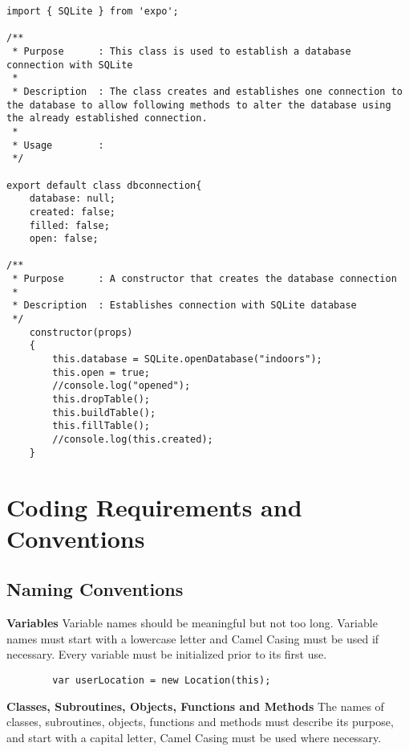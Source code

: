 \documentclass{article}
\begin{document}
\begin{lstlisting}
import { SQLite } from 'expo';

/**
 * Purpose		: This class is used to establish a database connection with SQLite
 * 
 * Description	: The class creates and establishes one connection to the database to allow following methods to alter the database using the already established connection.
 * 
 * Usage        :       
 */

export default class dbconnection{
	database: null;
	created: false;
	filled: false;
	open: false;

/**
 * Purpose		: A constructor that creates the database connection
 * 
 * Description	: Establishes connection with SQLite database
 */
	constructor(props)
	{
		this.database = SQLite.openDatabase("indoors");
		this.open = true;
		//console.log("opened");
		this.dropTable();
		this.buildTable();
		this.fillTable();
		//console.log(this.created);
	}

\end{lstlisting}



\pagebreak


\section{Coding Requirements and Conventions}
\subsection{Naming Conventions}
    \indent \textbf{Variables}
     Variable names should be meaningful but not too long. Variable 
     \indent names must start with a lowercase letter and Camel Casing must be used if  \indent necessary. Every variable must be initialized prior to its first use.
     \begin{lstlisting}
        var userLocation = new Location(this);
    \end{lstlisting}
    \newline \newline
    \indent  \indent \textbf{Classes, Subroutines, Objects, Functions and Methods}
    The names \indent of classes, subroutines, objects, functions and methods must describe its \indent purpose, and start with a capital letter, Camel Casing must be used where \indent necessary. 
    
\end{document}
